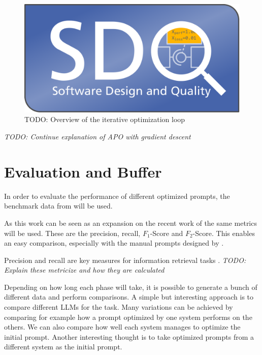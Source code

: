 \begin{figure}[h]
\centering
\includegraphics[width=12cm]{logos/sdqlogo}
\caption{TODO: Overview of the iterative optimization loop}
\label{fig:sdqlogo}
\end{figure}

\textit{TODO: Continue explanation of APO with gradient descent}

\section{Evaluation and Buffer}
In order to evaluate the performance of different optimized prompts, the benchmark data from \citeauthor{fuchss2022establishing} \cite{fuchss2022establishing} will be used.

As this work can be seen as an expansion on the recent work of  the same metrics will be used. These are the precision, recall, $F_1$-Score and $F_2$-Score. This enables an easy comparison, especially with the manual prompts designed by .

Precision and recall are key measures for information retrieval tasks \cite{hayes2006advancing}. 
\textit{TODO: Explain these metricize and how they are calculated}

Depending on how long each phase will take, it is possible to generate a bunch of different data and perform comparisons.
A simple but interesting approach is to compare different LLMs for the task. Many variations can be achieved by comparing for example how a prompt optimized by one system performs on the others. We can also compare how well each system manages to optimize the initial prompt. 
Another interesting thought is to take optimized prompts from a different system as the initial prompt. 